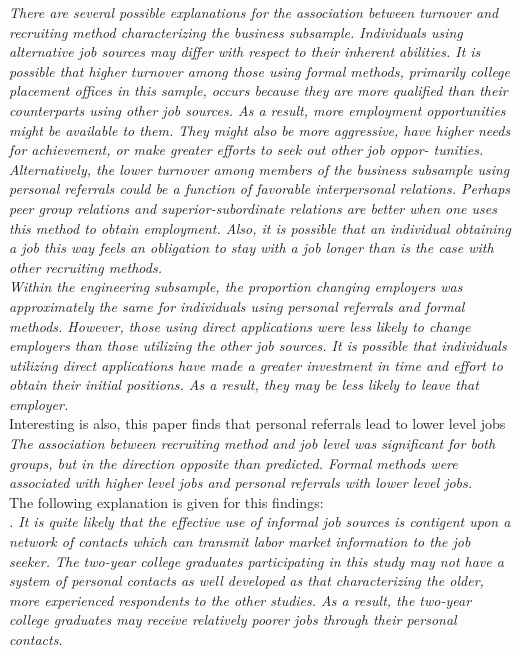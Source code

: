 \documentclass[a4paper, 11pt]{article} %
\begin{document}
\emph{There are several possible explanations for the association 
between turnover and recruiting method characterizing the 
business subsample. Individuals using alternative job sources may 
differ with respect to their inherent abilities. It is possible that 
higher turnover among those using formal methods, primarily 
college placement offices in this sample, occurs because they are 
more qualified than their counterparts using other job sources. 
As a result, more employment opportunities might be available 
to them. They might also be more aggressive, have higher needs for 
achievement, or make greater efforts to seek out other job oppor- 
tunities. Alternatively, the lower turnover among members of the 
business subsample using personal referrals could be a function 
of favorable interpersonal relations. Perhaps peer group relations 
and superior-subordinate relations are better when one uses this 
method to obtain employment. Also, it is possible that an 
individual obtaining a job this way feels an obligation to stay with 
a job longer than is the case with other recruiting methods.}\\ 

\emph{Within the engineering subsample, the proportion changing 
employers was approximately the same for individuals using 
personal referrals and formal methods. However, those using direct 
applications were less likely to change employers than those 
utilizing the other job sources. It is possible that individuals 
utilizing direct applications have made a greater investment in 
time and effort to obtain their initial positions. As a result, they 
may be less likely to leave that employer.}\\

Interesting is also, this paper finds that personal referrals lead to lower level jobs\\

\emph{The association between recruiting method and job level 
was significant for both groups, but in the direction opposite 
than predicted. Formal methods were associated with higher level 
jobs and personal referrals with lower level jobs.}\\

The following explanation is given for this findings:\\

\emph{. It is quite likely that the effective use of 
informal job sources is contigent upon a network of contacts 
which can transmit labor market information to the job seeker. 
The two-year college graduates participating in this study may 
not have a system of personal contacts as well developed as 
that characterizing the older, more experienced respondents 
to the other studies. As a result, the two-year college graduates 
may receive relatively poorer jobs through their personal contacts.}\\
\end{document}
